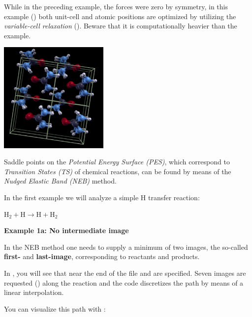 \documentclass[landscape]{foils}
\begin{document}

While in the preceding example, the forces were zero by symmetry, in
this example () both unit-cell and atomic
positions are optimized by utilizing the {\em variable-cell
  relaxation} ().  Beware that it is
computationally heavier than the  example.

\begin{center}
  \includegraphics[width=0.4\textwidth]{figs/urea.png}
\end{center}

%
Saddle points on the {\em Potential Energy Surface (PES)}, which
correspond to {\em Transition States (TS)} of chemical reactions, can
be found by means of the {\em Nudged Elastic Band (NEB)} method.

In the first example we will analyze a simple H transfer reaction:
\begin{center}
{\large $\mathrm{H_2 + H \rightarrow H + H_2}$}
\end{center}
{\bf Example 1a: No intermediate image}

In the NEB method one needs to supply a minimum of two images, the
so-called {\bf first-} and {\bf last-image}, corresponding to
reactants and products.

In , you will see that near the end of the file
 and  are specified. Seven
images are requested () along the
reaction and the  code discretizes the path
by means of a linear interpolation.

You can visualize this path with :
\end{document}

